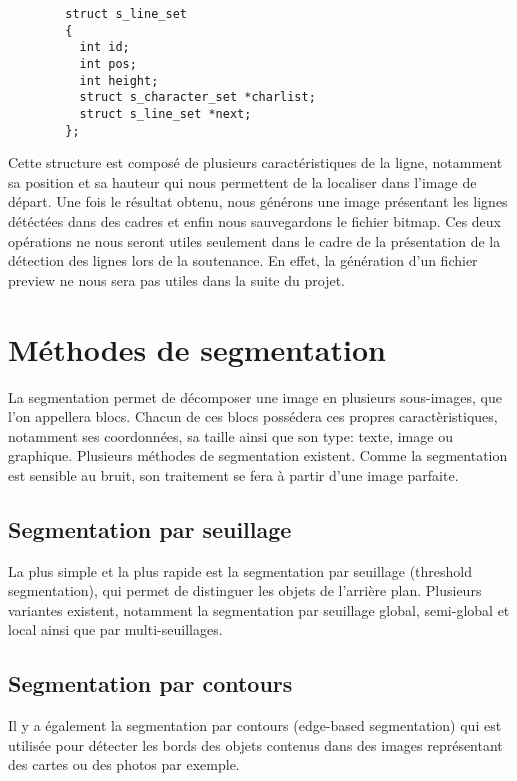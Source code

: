 \documentclass[]{report}
\begin{document}
      \begin{verbatim}
        struct s_line_set
        {
          int id;
          int pos;
          int height;
          struct s_character_set *charlist;
          struct s_line_set *next;
        };
      \end{verbatim}

      Cette structure est composé de plusieurs caractéristiques de la ligne, notamment sa position et sa hauteur qui nous permettent de la localiser dans l'image de départ.
      Une fois le résultat obtenu, nous générons une image présentant les lignes détéctées dans des cadres et enfin nous sauvegardons le fichier bitmap. Ces deux opérations ne nous seront utiles seulement dans le cadre de la présentation de la détection des lignes lors de la soutenance. En effet, la génération d'un fichier preview ne nous sera pas utiles dans la suite du projet.


    \section{M\'ethodes de segmentation} %
    \label{sec:m'ethodes_de_segmentation}
      La segmentation permet de décomposer une image en plusieurs sous-images, que l'on appellera blocs. Chacun de ces blocs possédera ces propres caractèristiques, notamment ses coordonnées, sa taille ainsi que son type: texte, image ou graphique. Plusieurs méthodes de segmentation existent. Comme la segmentation est sensible au bruit, son traitement se fera à partir d'une image parfaite.
      \subsection{Segmentation par seuillage}
      La plus simple et la plus rapide est la segmentation par seuillage (threshold segmentation), qui permet de distinguer les objets de l'arrière plan. Plusieurs variantes existent, notamment la segmentation par seuillage global, semi-global et local ainsi que par multi-seuillages.
      
      
      \subsection{Segmentation par contours}
      Il y a également la segmentation par contours (edge-based segmentation) qui est utilisée pour détecter les bords des objets contenus dans des images représentant des cartes ou des photos par exemple.
      
\end{document}
